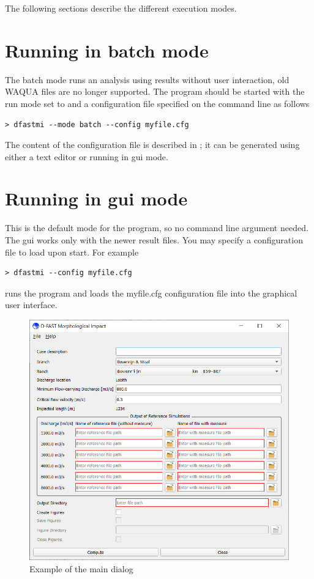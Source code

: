 The following sections describe the different execution modes.

\section{Running in batch mode}

The batch mode runs an analysis using \dflowfm results without user interaction, old WAQUA files are no longer supported.
The program should be started with the run mode set to  and a configuration file specified on the command line as follows

\begin{Verbatim}
> dfastmi --mode batch --config myfile.cfg
\end{Verbatim}

The content of the configuration file is described in ; it can be generated using either a text editor or \dfastmi running in gui mode.

\section{Running in gui mode}

This is the default mode for the program, so no command line argument needed.
The gui works only with the newer \dflowfm result files.
You may specify a configuration file to load upon start.
For example

\begin{Verbatim}
> dfastmi --config myfile.cfg
\end{Verbatim}

runs the program and loads the myfile.cfg configuration file into the graphical user interface.

\begin{figure}
\center
\includegraphics[width=12cm]{figures/main_dialog.png}
\caption{Example of the main dialog}
\end{figure}

